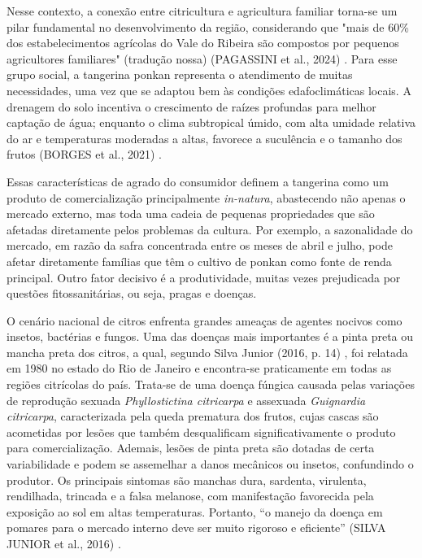 \documentclass[11pt,a4paper]{article}
\begin{document}
Nesse contexto, a conexão entre citricultura e agricultura familiar torna-se um pilar fundamental no desenvolvimento da região, considerando que "mais de 60\% dos estabelecimentos agrícolas do Vale do Ribeira são compostos por pequenos agricultores familiares" (tradução nossa) (PAGASSINI et al., 2024) \cite{Pagassini2024}. Para esse grupo social, a tangerina ponkan representa o atendimento de muitas necessidades, uma vez que se adaptou bem às condições edafoclimáticas locais. A drenagem do solo incentiva o crescimento de raízes profundas para melhor captação de água; enquanto o clima subtropical úmido, com alta umidade relativa do ar e temperaturas moderadas a altas, favorece a suculência e o tamanho dos frutos (BORGES et al., 2021) \cite{Borges2021}.

Essas características de agrado do consumidor definem a tangerina como um produto de comercialização principalmente \emph{in-natura}, abastecendo não apenas o mercado externo, mas toda uma cadeia de pequenas propriedades que são afetadas diretamente pelos problemas da cultura. Por exemplo, a sazonalidade do mercado, em razão da safra concentrada entre os meses de abril e julho, pode afetar diretamente famílias que têm o cultivo de ponkan como fonte de renda principal. Outro fator decisivo é a produtividade, muitas vezes prejudicada por questões fitossanitárias, ou seja, pragas e doenças. 

O cenário nacional de citros enfrenta grandes ameaças de agentes nocivos como insetos, bactérias e fungos. Uma das doenças mais importantes é a pinta preta ou mancha preta dos citros, a qual, segundo Silva Junior (2016, p. 14) \cite{SilvaJunior2016}, foi relatada em 1980 no estado do Rio de Janeiro e encontra-se praticamente em todas as regiões citrícolas do país. Trata-se de uma doença fúngica causada pelas variações de reprodução sexuada \emph{Phyllostictina citricarpa} e assexuada \emph{Guignardia citricarpa}, caracterizada pela queda prematura dos frutos, cujas cascas são acometidas por lesões que também desqualificam significativamente o produto para comercialização. Ademais, lesões de pinta preta são dotadas de certa variabilidade e podem se assemelhar a danos mecânicos ou insetos, confundindo o produtor. Os principais sintomas são manchas dura, sardenta, virulenta, rendilhada, trincada e a falsa melanose, com manifestação favorecida pela exposição ao sol em altas temperaturas. Portanto, “o manejo da doença em pomares para o mercado interno deve ser muito rigoroso e eficiente” (SILVA JUNIOR et al., 2016) \cite{SilvaJunior2016}.
\end{document}
